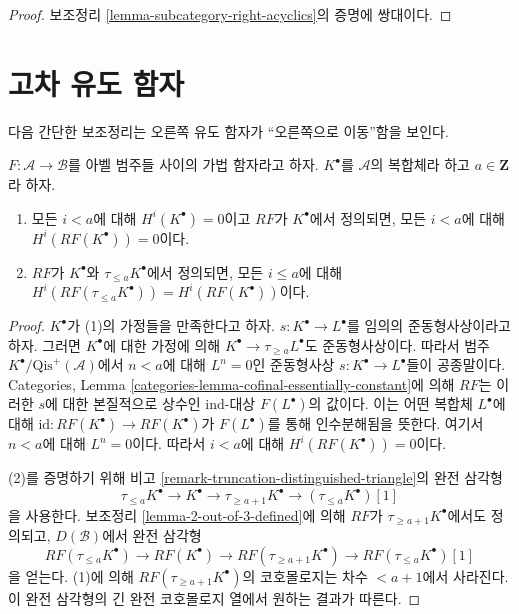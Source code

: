 \begin{proof}
보조정리 \ref{lemma-subcategory-right-acyclics}의 증명에 쌍대이다.
\end{proof}





\section{고차 유도 함자}
\label{section-higher-derived}

\noindent
다음 간단한 보조정리는 오른쪽 유도 함자가 “오른쪽으로 이동”함을 보인다.

\begin{lemma}
\label{lemma-negative-vanishing}
$F : \mathcal{A} \to \mathcal{B}$를 아벨 범주들 사이의 가법 함자라고
하자. $K^\bullet$를 $\mathcal{A}$의 복합체라 하고
$a \in \mathbf{Z}$라 하자.
\begin{enumerate}
\item 모든 $i < a$에 대해 $H^i(K^\bullet) = 0$이고 $RF$가
$K^\bullet$에서 정의되면, 모든 $i < a$에 대해
$H^i(RF(K^\bullet)) = 0$이다.
\item $RF$가 $K^\bullet$와 $\tau_{\leq a}K^\bullet$에서 정의되면,
모든 $i \leq a$에 대해
$H^i(RF(\tau_{\leq a}K^\bullet)) = H^i(RF(K^\bullet))$이다.
\end{enumerate}
\end{lemma}

\begin{proof}
$K^\bullet$가 (1)의 가정들을 만족한다고 하자.
$s : K^\bullet \to L^\bullet$를 임의의 준동형사상이라고 하자.
그러면 $K^\bullet$에 대한 가정에 의해
$K^\bullet \to \tau_{\geq a}L^\bullet$도 준동형사상이다.
따라서 범주 $K^\bullet/\text{Qis}^{+}(\mathcal{A})$에서
$n < a$에 대해 $L^n = 0$인 준동형사상
$s : K^\bullet \to L^\bullet$들이 공종말이다. Categories, Lemma
\ref{categories-lemma-cofinal-essentially-constant}에 의해 $RF$는
이러한 $s$에 대한 본질적으로 상수인 ind-대상 $F(L^\bullet)$의 값이다.
이는 어떤 복합체 $L^\bullet$에 대해
$\text{id} : RF(K^\bullet) \to RF(K^\bullet)$가 $F(L^\bullet)$를 통해
인수분해됨을 뜻한다. 여기서 $n < a$에 대해 $L^n = 0$이다.
따라서 $i < a$에 대해 $H^i(RF(K^\bullet)) = 0$이다.

\medskip\noindent
(2)를 증명하기 위해 비고
\ref{remark-truncation-distinguished-triangle}의 완전 삼각형
$$
\tau_{\leq a}K^\bullet \to K^\bullet \to \tau_{\geq a + 1}K^\bullet
\to (\tau_{\leq a}K^\bullet)[1]
$$
을 사용한다. 보조정리 \ref{lemma-2-out-of-3-defined}에 의해 $RF$가
$\tau_{\geq a + 1}K^\bullet$에서도 정의되고, $D(\mathcal{B})$에서
완전 삼각형
$$
RF(\tau_{\leq a}K^\bullet) \to RF(K^\bullet) \to RF(\tau_{\geq a + 1}K^\bullet)
\to RF(\tau_{\leq a}K^\bullet)[1]
$$
을 얻는다. (1)에 의해 $RF(\tau_{\geq a + 1}K^\bullet)$의 코호몰로지는
차수 $< a + 1$에서 사라진다. 이 완전 삼각형의 긴 완전 코호몰로지 열에서
원하는 결과가 따른다.
\end{proof}

